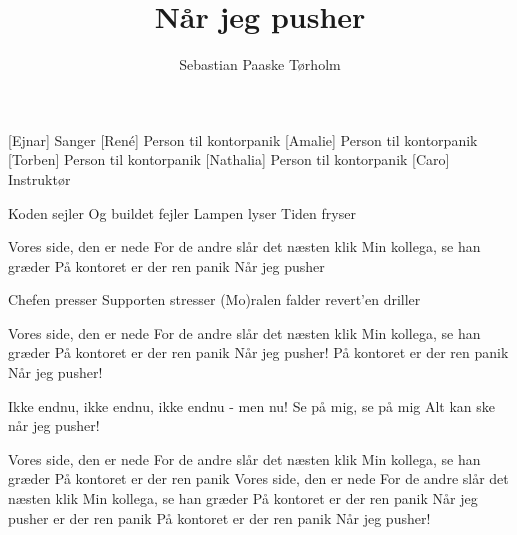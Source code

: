 \documentclass[a4paper,11pt]{article}
\title{Når jeg pusher}
\author{Sebastian Paaske Tørholm}
\begin{document}
\maketitle

\begin{roles}
[Ejnar] Sanger
[René] Person til kontorpanik
[Amalie] Person til kontorpanik
[Torben] Person til kontorpanik
[Nathalia] Person til kontorpanik
[Caro] Instruktør
\end{roles}

\begin{song}

Koden sejler
Og buildet fejler
Lampen lyser
Tiden fryser

Vores side, den er nede
For de andre slår det næsten klik
Min kollega, se han græder
På kontoret er der ren panik
Når jeg pusher

Chefen presser
Supporten stresser
(Mo)ralen falder
revert'en driller

Vores side, den er nede
For de andre slår det næsten klik
Min kollega, se han græder
På kontoret er der ren panik
Når jeg pusher!
På kontoret er der ren panik
Når jeg pusher!

Ikke endnu, ikke endnu, ikke endnu - men nu!
Se på mig, se på mig
Alt kan ske
når jeg pusher!


Vores side, den er nede
For de andre slår det næsten klik
Min kollega, se han græder
På kontoret er der ren panik
Vores side, den er nede
For de andre slår det næsten klik
Min kollega, se han græder
På kontoret er der ren panik
Når jeg pusher er der ren panik
På kontoret er der ren panik
Når jeg pusher!

\end{song}
\end{document}
